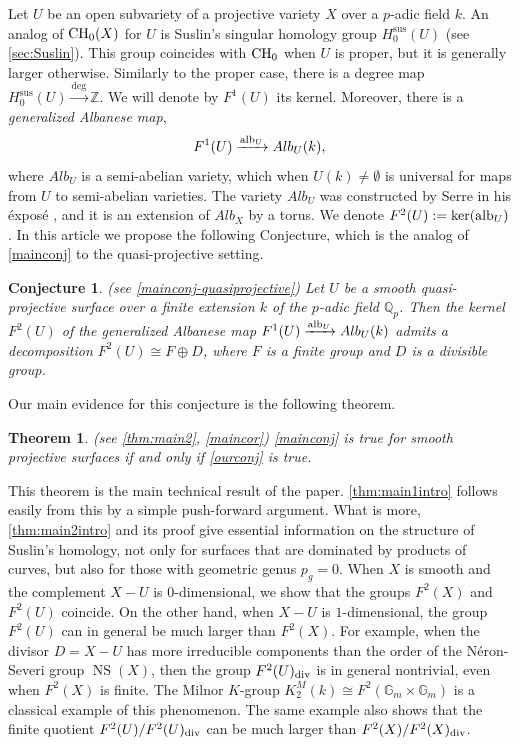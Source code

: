 \documentclass[12pt]{amsart}
\newtheorem{theo}[theo]{Theorem}
\newtheorem{conj}[conj]{Conjecture}
\theoremstyle{remark}
\newcommand{\G}{{\mathbb G}}
\newcommand{\Q}{{\mathbb Q}}
\newcommand{\Z}{{\mathbb Z}}
\renewcommand{\1}{{\mathbb{S}}}
\newcommand{\alb}{{\rm alb}}
\newcommand{\CH}{{\rm CH}}
\newcommand{\NS}{{\operatorname{NS}}}
\newcommand{\<}{\langle}
\renewcommand{\>}{\rangle}
\newcommand{\Sus}{{\operatorname{sus}}}
\newcommand{\dv}{{\rm div}}
\begin{document}
Let $U$ be an open subvariety of a projective variety $X$ over a $p$-adic field $k$. An analog of $\CH_0(X)$ for $U$ is Suslin's singular homology group $H_0^{\Sus}(U)$ (see \autoref{sec:Suslin}). This group coincides with $\CH_0$ when $U$ is proper, but it is generally larger otherwise. Similarly to the proper case, there is a degree map $H_0^{\Sus}(U)\xrightarrow{\deg}\Z$. We will denote by $F^1(U)$ its kernel. Moreover, there is a \textit{generalized Albanese map}, \[F^1(U)\xrightarrow{\alb_U} Alb_U(k),\] where $Alb_U$ is a semi-abelian variety, which when $U(k)\neq\emptyset$ is universal for maps from $U$ to semi-abelian varieties. The variety $Alb_U$ was constructed by Serre in his \'{e}xpos\'{e} \cite{Se},  and it is an extension of $Alb_X$ by a torus.  We denote  $F^2(U):=\ker(\alb_U)$.  In this article we propose the following Conjecture, which is the analog of \autoref{mainconj} to the quasi-projective setting. 


\begin{conj}\label{ourconj} (see \autoref{mainconj-quasiprojective}) Let $U$ be a smooth quasi-projective surface over a finite extension $k$ of the $p$-adic field $\Q_p$. 
Then the kernel $F^2(U)$ of the generalized Albanese map $F^1(U)\xrightarrow{\alb_U} Alb_U(k)$ admits a decomposition $F^2(U)\cong F\oplus D$, where $F$ is a finite group and $D$ is a divisible group.
\end{conj}

Our main evidence for this conjecture is the following theorem.

\begin{theo}\label{thm:main2intro} (see \autoref{thm:main2}, \autoref{maincor}) \autoref{mainconj} is true for smooth projective surfaces if and only if \autoref{ourconj} is true.
\end{theo} 
This theorem is the main technical result of the paper. \autoref{thm:main1intro} follows easily from this by a simple push-forward argument. 
What is more, \autoref{thm:main2intro} and its proof give essential information on the structure of Suslin's homology,  not only for surfaces that are dominated by products of curves, but also for those with geometric genus $p_g=0$.  When $X$ is smooth and the complement $X-U$ is $0$-dimensional, we show that the groups $F^2(X)$ and $F^2(U)$ coincide. On the other hand, when $X-U$ is $1$-dimensional, the group $F^2(U)$ can in general be much larger than $F^2(X)$. For example, when the divisor $D=X-U$ has more irreducible components than the order of the N\'{e}ron-Severi group $\NS(X)$, then the group $F^2(U)_{\dv}$ is in general nontrivial, even when $F^2(X)$ is finite. The Milnor $K$-group $K_2^M(k)\cong F^2(\G_m\times\G_m)$ is a classical example of this phenomenon. The same example also shows that the finite quotient $F^2(U)/F^2(U)_{\dv}$ can be much larger than $F^2(X)/F^2(X)_{\dv}$. 
\end{document}
